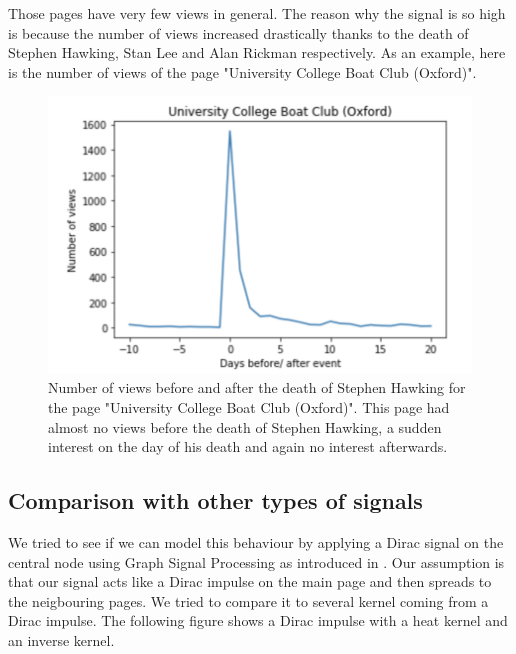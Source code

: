 \documentclass[conference]{IEEEtran}
\begin{document}
\medskip
Those pages have very few views in general. The reason why the signal is so high is because the number of views increased drastically thanks to the death of Stephen Hawking, Stan Lee and Alan Rickman respectively. As an example, here is the number of views of the page "University College Boat Club (Oxford)". 

\begin{figure}[!htb]
  \includegraphics[width=\linewidth]{uniboat.png}
\caption{Number of views before and after the death of Stephen Hawking for the page "University College Boat Club (Oxford)". This page had almost no views before the death of Stephen Hawking, a sudden interest on the day of his death and again no interest afterwards.}
\end{figure}

\subsection{Comparison with other types of signals}

We tried to see if we can model this behaviour by applying a Dirac signal on the central node using Graph Signal Processing as introduced in \cite{signalprocessing}.
Our assumption is that our signal acts like a Dirac impulse on the main page and then spreads to the neigbouring pages. We tried to compare it to several kernel coming from a Dirac impulse. The following figure shows a Dirac impulse with a heat kernel and an inverse kernel. 
\end{document}
